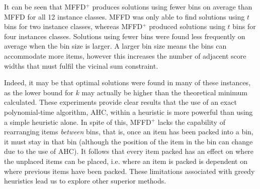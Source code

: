 \documentclass[authoryear]{elsarticle}
\begin{document}
It can be seen that MFFD$^+$ produces solutions using fewer bins on average than MFFD for all 12 instance classes. MFFD was only able to find solutions using $t$ bins for two instance classes, whereas MFFD$^+$ produced solutions using $t$ bins for four instances classes. Solutions using fewer bins were found less frequently on average when the bin size is larger. A larger bin size means the bins can accommodate more items, however this increases the number of adjacent score widths that must fulfil the vicinal sum constraint. 


Indeed, it may be that optimal solutions were found in many of these instances, as the lower bound for $k$ may actually be higher than the theoretical minimum calculated. These experiments provide clear results that the use of an exact polynomial-time algorithm, AHC, within a heuristic is more powerful than using a simple heuristic alone. In spite of this, MFFD$^+$ lacks the capability of rearranging items \emph{between} bins, that is, once an item has been packed into a bin, it must stay in that bin (although the position of the item in the bin can change due to the use of AHC). It follows that every item packed has an effect on where the unplaced items can be placed, i.e. where an item is packed is dependent on where previous items have been packed. These limitations associated with greedy heuristics lead us to explore other superior methods.

\begin{comment}
{\color{myPink}
\begin{itemize}[leftmargin=*]
	\item Number of types on average real instances.
	\item Number of items per bin.
\end{itemize}
}
\end{comment}

\end{document}
